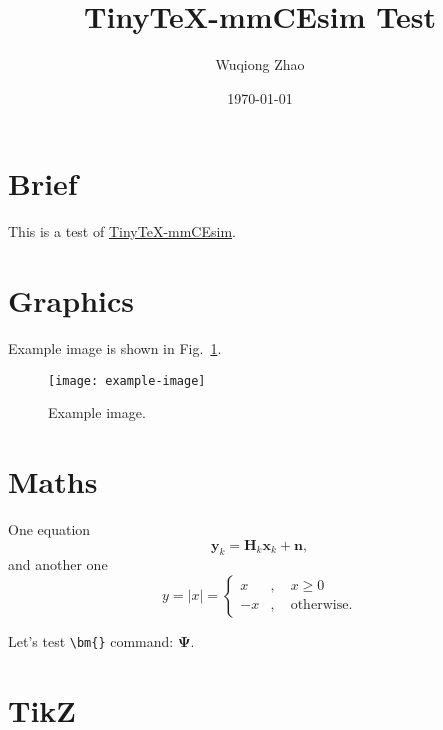 \documentclass{article}
\title{TinyTeX-mmCEsim Test}
\author{Wuqiong Zhao}
\date{\today}
\begin{document}
  \maketitle

  \section{Brief}
    This is a test of \href{https://github.com/mmcesim/tinytex-mmcesim}{TinyTeX-mmCEsim}.

  \section{Graphics}
    
    Example image is shown in Fig.~\ref{fig:example}.
    \begin{figure}[htbp]
      \centering
      \texttt{[image: example-image]}
      \caption{Example image.}
      \label{fig:example}
    \end{figure}

  \section{Maths}

    One equation
    \begin{equation}
      \mathbf{y}_k=\mathbf{H}_k\mathbf{x}_k+\mathbf{n},
    \end{equation}
    and another one
    \begin{equation}
      y=|x|=
      \left\{
        \begin{aligned}
          x&,\quad x\geq0\\
          -x&,\quad\mathrm{otherwise}.
        \end{aligned}
      \right.
    \end{equation}
    
    Let's test \verb+\bm{}+ command: $\bm{\Psi}$.

  \section{TikZ}

    \begin{figure}[htbp]
      \centering
    \end{figure}
  
\end{document}
